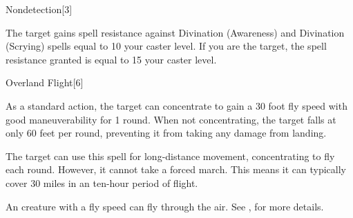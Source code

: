 \begin{spellsection}{Nondetection}[3]
    \begin{spellheader}
    \end{spellheader}
    \begin{spellcontent}
        \begin{spelltargetinginfo}
        \end{spelltargetinginfo}
        \begin{spelleffects}

            \spelleffect The target gains spell resistance against Divination (Awareness) and Divination (Scrying) spells equal to 10 \add your caster level. If you are the target, the spell resistance granted is equal to 15 \add your caster level.
            \spelldur \durext \dismissable
        \end{spelleffects}
    \end{spellcontent}
    \begin{spellfooter}
    \end{spellfooter}
\end{spellsection}

\begin{spellsection}{Overland Flight}[6]
    \begin{spellheader}
    \end{spellheader}
    \begin{spellcontent}
        \begin{spelltargetinginfo}
        \end{spelltargetinginfo}
        \begin{spelleffects}

            \spelleffect As a standard action, the target can concentrate to gain a 30 foot fly speed with good maneuverability for 1 round. When not concentrating, the target falls at only 60 feet per round, preventing it from taking any damage from landing.

            The target can use this spell for long-distance movement, concentrating to fly each round. However, it cannot take a forced march. This means it can typically cover 30 miles in an ten-hour period of flight.
            \spelldur \durext
        \end{spelleffects}
    \end{spellcontent}
    \begin{spellfooter}
        \spellnotes An \unencumbered creature with a fly speed can fly through the air. See , for more details.
    \end{spellfooter}
\end{spellsection}

